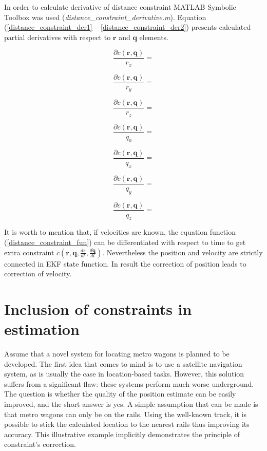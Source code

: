 In order to calculate derivative of distance constraint MATLAB Symbolic Toolbox was used \mbox{(\textit{distance\_constraint\_derivative.m})}. Equation (\ref{distance_constraint_der1} -- \ref{distance_constraint_der2}) presents calculated partial derivatives with respect to $\bm{r}$ and $\bm{q}$ elements.


\begin{equation}
	\frac{\partial c(\bm{r}, \bm{q})}{r_x} = 
	\label{distance_constraint_der1}
\end{equation}

\begin{equation}
	\frac{\partial c(\bm{r}, \bm{q})}{r_y} = 
\end{equation}

\begin{equation}
	\frac{\partial c(\bm{r}, \bm{q})}{r_z} = 
\end{equation}

\begin{equation}
	\frac{\partial c(\bm{r}, \bm{q})}{q_0} = 
\end{equation}

\begin{equation}
	\frac{\partial c(\bm{r}, \bm{q})}{q_x} = 
\end{equation}

\begin{equation}
	\frac{\partial c(\bm{r}, \bm{q})}{q_y} = 
\end{equation}

\begin{equation}
	\frac{\partial c(\bm{r}, \bm{q})}{q_z} =
	\label{distance_constraint_der2}
\end{equation}


It is worth to mention that, if velocities are known, the equation function (\ref{distance_constraint_fun}) can be differentiated with respect to time to get extra constraint $c(\bm{r}, \bm{q}, \frac{d\bm{r}}{dt}, \frac{d\bm{q}}{dt})$. Nevertheless the position and velocity are strictly connected in EKF state function. In result the correction of position leads to correction of velocity.



\section{Inclusion of constraints in estimation}

Assume that a novel system for locating metro wagons is planned to be developed. The first idea that comes to mind is to use a satellite navigation system, as is usually the case in location-based tasks. However, this solution suffers from a significant flaw: these systems perform much worse underground. The question is whether the quality of the position estimate can be easily improved, and the short answer is yes. A simple assumption that can be made is that metro wagons can only be on the rails. Using the well-known track, it is possible to stick the calculated location to the nearest rails thus improving its accuracy.
This illustrative example implicitly demonstrates the principle of constraint's correction.\\

